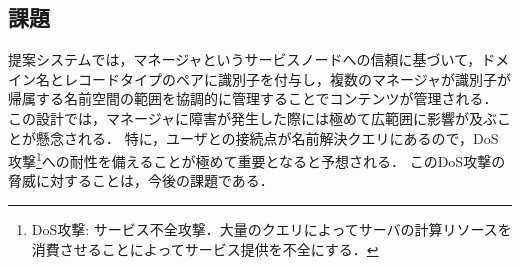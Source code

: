 \subsection{課題}
提案システムでは，マネージャというサービスノードへの信頼に基づいて，ドメイン名とレコードタイプのペアに識別子を付与し，複数のマネージャが識別子が帰属する名前空間の範囲を協調的に管理することでコンテンツが管理される．
この設計では，マネージャに障害が発生した際には極めて広範囲に影響が及ぶことが懸念される．
特に，ユーザとの接続点が名前解決クエリにあるので，DoS攻撃\footnote{DoS攻撃: サービス不全攻撃．大量のクエリによってサーバの計算リソースを消費させることによってサービス提供を不全にする．}への耐性を備えることが極めて重要となると予想される．
このDoS攻撃の脅威に対することは，今後の課題である．


